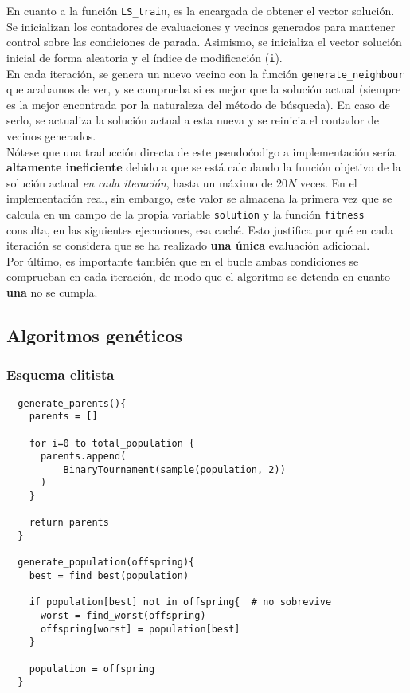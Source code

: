 \documentclass[11pt]{article}
\theoremstyle{plain}
\theoremstyle{definition}
\begin{document}
En cuanto a la función \texttt{LS\_train}, es la encargada de obtener el vector solución. Se inicializan los contadores de evaluaciones y vecinos generados para mantener control sobre las condiciones de parada. Asimismo, se inicializa el vector solución inicial de forma aleatoria y el índice de modificación (\texttt{i}). \\

En cada iteración, se genera un nuevo vecino con la función \texttt{generate\_neighbour} que acabamos de ver, y se comprueba si es mejor que la solución actual (siempre es la mejor encontrada por la naturaleza del método de búsqueda). En caso de serlo, se actualiza la solución actual a esta nueva y se reinicia el contador de vecinos generados. \\

Nótese que una traducción directa de este pseudoćodigo a implementación sería \textbf{altamente ineficiente} debido a que se está calculando la función objetivo de la solución actual \textit{en cada iteración}, hasta un máximo de $20N$ veces. En el implementación real, sin embargo, este valor se almacena la primera vez que se calcula en un campo de la propia variable \texttt{solution} y la función \texttt{fitness} consulta, en las siguientes ejecuciones, esa caché. Esto justifica por qué en cada iteración se considera que se ha realizado \textbf{una única} evaluación adicional. \\

Por último, es importante también que en el bucle ambas condiciones se comprueban en cada iteración, de modo que el algoritmo se detenda en cuanto \textbf{una} no se cumpla. \\

\subsection{Algoritmos genéticos}
\subsubsection{Esquema elitista}

\begin{lstlisting}
  generate_parents(){
    parents = []

    for i=0 to total_population {
      parents.append(
          BinaryTournament(sample(population, 2))
      )
    }

    return parents
  }

  generate_population(offspring){
    best = find_best(population)

    if population[best] not in offspring{  # no sobrevive
      worst = find_worst(offspring)
      offspring[worst] = population[best]
    }

    population = offspring
  }
\end{lstlisting}
\end{document}
